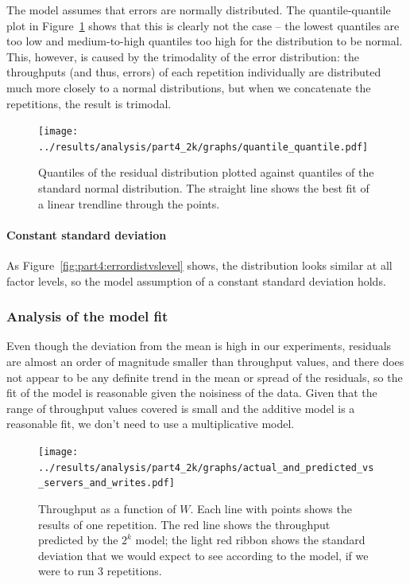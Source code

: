 \documentclass[11pt]{article}
\begin{document}
The model assumes that errors are normally distributed. The quantile-quantile plot in Figure~\ref{fig:part4:quantile_quantile} shows that this is clearly not the case -- the lowest quantiles are too low and medium-to-high quantiles too high for the distribution to be normal. This, however, is caused by the trimodality of the error distribution: the throughputs (and thus, errors) of each repetition individually are distributed much more closely to a normal distributions, but when we concatenate the repetitions, the result is trimodal.

\begin{figure}
\centering
\texttt{[image: ../results/analysis/part4\_2k/graphs/quantile\_quantile.pdf]}
\caption{Quantiles of the residual distribution plotted against quantiles of the standard normal distribution. The straight line shows the best fit of a linear trendline through the points.}
\label{fig:part4:quantile_quantile}
\end{figure}


\paragraph{Constant standard deviation} As Figure~\ref{fig:part4:errordistvslevel} shows, the distribution looks similar at all factor levels, so the model assumption of a constant standard deviation holds.


\subsubsection{Analysis of the model fit}

Even though the deviation from the mean is high in our experiments, residuals are almost an order of magnitude smaller than throughput values, and there does not appear to be any definite trend in the mean or spread of the residuals, so the fit of the model is reasonable given the noisiness of the data. Given that the range of throughput values covered is small and the additive model is a reasonable fit, we don't need to use a multiplicative model.

\begin{figure}[h]
\centering
\texttt{[image: ../results/analysis/part4\_2k/graphs/actual\_and\_predicted\_vs\_servers\_and\_writes.pdf]}
\caption{Throughput as a function of $W$. Each line with points shows the results of one repetition. The red line shows the throughput predicted by the $2^k$ model; the light red ribbon shows the standard deviation that we would expect to see according to the model, if we were to run 3 repetitions.}
\label{fig:part4:actual_and_predicted_vs_servers_and_writes}
\end{figure}
\end{document}
